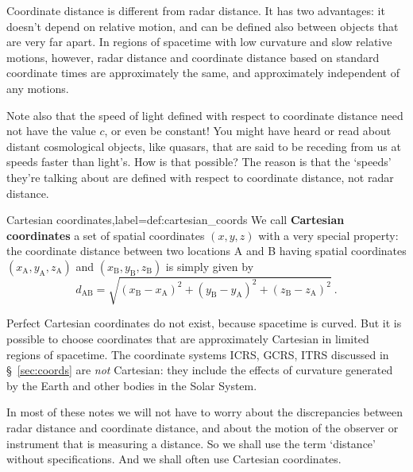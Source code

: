 \documentclass[a4paper,12pt,%
onecolumn,oneside,%
british%
]{memoir}
\renewcommand*{\|}[1][]{\nonscript\:#1\vert\nonscript\:\mathopen{}}
\newcommand*{\sect}{\S}%
\newcommand*{\yc}{c} %
\begin{document}
Coordinate distance is different from radar distance. It has two advantages: it doesn't depend on relative motion, and can be defined also between objects that are very far apart. In regions of spacetime with low curvature and slow relative motions, however, radar distance and coordinate distance based on standard coordinate times are approximately the same, and approximately independent of any motions.

Note also that the speed of light defined with respect to coordinate distance need not have the value $\yc$, or even be constant! You might have heard or read about  distant cosmological objects, like quasars, that are said to be receding from us at speeds faster than light's. How is that possible? The reason is that the \enquote*{speeds} they're talking about are defined with respect to coordinate distance, not radar distance.

\medskip

\begin{definition}{Cartesian coordinates,label={def:cartesian_coords}}
We call \textbf{Cartesian coordinates} a set of spatial coordinates $(x,y,z)$ with a very special property: the coordinate distance between two locations A and B having spatial coordinates $(x_{\textrm{A}}, y_{\textrm{A}}, z_{\textrm{A}})$ and $(x_{\textrm{B}}, y_{\textrm{B}}, z_{\textrm{B}})$ is simply given by
\begin{equation}
  \label{eq:distance_cartesian}
  d_{\textrm{A}\textrm{B}} = \sqrt{
    (x_{\textrm{B}} - x_{\textrm{A}})^{2} +
    (y_{\textrm{B}} - y_{\textrm{A}})^{2} +
    (z_{\textrm{B}} - z_{\textrm{A}})^{2}
  } \ .
\end{equation}
\end{definition}

Perfect Cartesian coordinates do not exist, because spacetime is curved. But it is possible to choose coordinates that are approximately Cartesian in limited regions of spacetime. The coordinate systems ICRS, GCRS, ITRS discussed in \sect~\ref{sec:coords} are \emph{not} Cartesian: they include the effects of curvature generated by the Earth and other bodies in the Solar System.

In most of these notes we will not have to worry about the discrepancies between radar distance and coordinate distance, and about the motion of the observer or instrument that is measuring a distance. So we shall use the term \enquote*{distance} without specifications. And we shall often use Cartesian coordinates.
\end{document}
